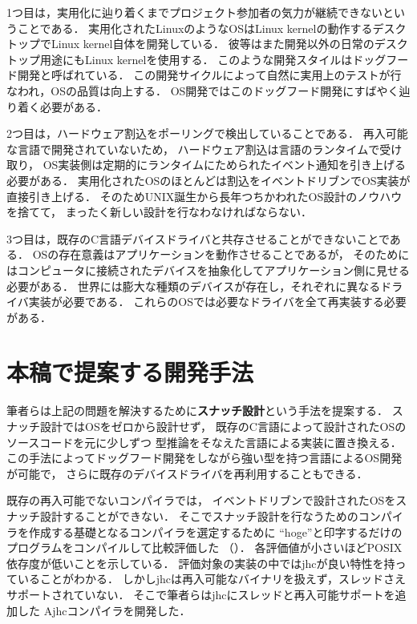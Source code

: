 \documentclass[submit,techreq,noauthor]{ipsj}
\begin{document}
1つ目は，実用化に辿り着くまでプロジェクト参加者の気力が継続できないということである．
実用化されたLinuxのようなOSはLinux kernelの動作するデスクトップでLinux kernel自体を開発している．
彼等はまた開発以外の日常のデスクトップ用途にもLinux kernelを使用する．
このような開発スタイルはドッグフード開発と呼ばれている．
この開発サイクルによって自然に実用上のテストが行なわれ，OSの品質は向上する．
OS開発ではこのドッグフード開発にすばやく辿り着く必要がある．

2つ目は，ハードウェア割込をポーリングで検出していることである．
再入可能な言語で開発されていないため，
ハードウェア割込は言語のランタイムで受け取り，
OS実装側は定期的にランタイムにためられたイベント通知を引き上げる必要がある．
実用化されたOSのほとんどは割込をイベントドリブンでOS実装が直接引き上げる．
そのためUNIX誕生から長年つちかわれたOS設計のノウハウを捨てて，
まったく新しい設計を行なわなければならない．

3つ目は，既存のC言語デバイスドライバと共存させることができないことである．
OSの存在意義はアプリケーションを動作させることであるが，
そのためにはコンピュータに接続されたデバイスを抽象化してアプリケーション側に見せる必要がある．
世界には膨大な種類のデバイスが存在し，それぞれに異なるドライバ実装が必要である．
これらのOSでは必要なドライバを全て再実装する必要がある．

\section{本稿で提案する開発手法}

筆者らは上記の問題を解決するために\textbf{スナッチ設計}という手法を提案する．
スナッチ設計ではOSをゼロから設計せず，
既存のC言語によって設計されたOSのソースコードを元に少しずつ
型推論をそなえた言語による実装に置き換える．
この手法によってドッグフード開発をしながら強い型を持つ言語によるOS開発が可能で，
さらに既存のデバイスドライバを再利用することもできる．

既存の再入可能でないコンパイラでは，
イベントドリブンで設計されたOSをスナッチ設計することができない．
そこでスナッチ設計を行なうためのコンパイラを作成する基礎となるコンパイラを選定するために
``hoge''と印字するだけのプログラムをコンパイルして比較評価した
（）．
各評価値が小さいほどPOSIX依存度が低いことを示している．
評価対象の実装の中ではjhc\cite{jhc}が良い特性を持っていることがわかる．
しかしjhcは再入可能なバイナリを扱えず，スレッドさえサポートされていない．
そこで筆者らはjhcにスレッドと再入可能サポートを追加した
Ajhcコンパイラを開発した\cite{j-ikamusume5}．
\end{document}
